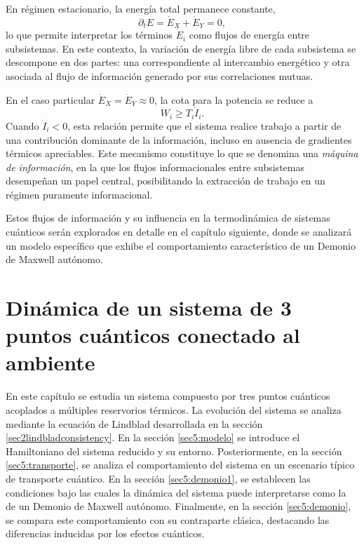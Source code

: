En régimen estacionario, la energía total permanece constante,
\[
    \partial_{t}E = \dot{E}_{X} + \dot{E}_{Y} = 0,
\]
lo que permite interpretar los términos $\dot{E}_{i}$ como flujos de energía entre subsistemas. En este contexto, la variación de energía libre de cada subsistema se descompone en dos partes: una correspondiente al intercambio energético y otra asociada al flujo de información generado por sus correlaciones mutuas.

En el caso particular $\dot{E}_{X} = \dot{E}_{Y} \approx 0$, la cota para la potencia se reduce a
\[
     \dot{W}_{i} \geq T_{i}\dot{I}_{i}.
\]
Cuando $\dot{I}_{i}<0$, esta relación permite que el sistema realice trabajo a partir de una contribución dominante de la información, incluso en ausencia de gradientes térmicos apreciables. Este mecanismo constituye lo que se denomina una \textit{máquina de información}, en la que los flujos informacionales entre subsistemas desempeñan un papel central, posibilitando la extracción de trabajo en un régimen puramente informacional. 

Estos flujos de información y su influencia en la termodinámica de sistemas cuánticos serán explorados en detalle en el capítulo siguiente, donde se analizará un modelo específico que exhibe el comportamiento característico de un Demonio de Maxwell autónomo.

\label{sec4:flujos0}

\chapter{Dinámica de un sistema de 3 puntos cuánticos conectado al ambiente}
En este capítulo se estudia un sistema compuesto por tres puntos cuánticos acoplados a múltiples reservorios térmicos. La evolución del sistema se analiza mediante la ecuación de Lindblad desarrollada en la sección \ref{sec2lindbladconsistency}. En la sección \ref{sec5:modelo} se introduce el Hamiltoniano del sistema reducido y su entorno. Posteriormente, en la sección \ref{sec5:transporte}, se analiza el comportamiento del sistema en un escenario típico de transporte cuántico. En la sección \ref{sec5:demonio1}, se establecen las condiciones bajo las cuales la dinámica del sistema puede interpretarse como la de un Demonio de Maxwell autónomo. Finalmente, en la sección \ref{sec5:demonio}, se compara este comportamiento con su contraparte clásica, destacando las diferencias inducidas por los efectos cuánticos.

